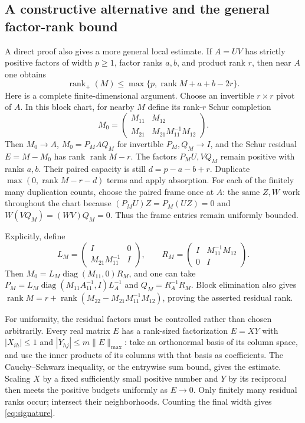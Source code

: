 \documentclass[11pt]{article}
\theoremstyle{definition}\newtheorem{definition}[theorem]{Definition}
\theoremstyle{remark}\newtheorem{remark}[theorem]{Remark}
\newcommand{\rk}{\operatorname{rank}}
\newcommand{\rp}{\operatorname{rank}_{+}}
\begin{document}
\subsection{A constructive alternative and the general factor-rank bound}
A direct proof also gives a more general local estimate. If $A=UV$ has strictly positive factors of width $p\ge1$, factor ranks $a,b$, and product rank $r$, then near $A$ one obtains
\begin{equation}\label{eq:signature}
\rp(M)\le\max\{p,\rk M+a+b-2r\}.
\end{equation}
Here is a complete finite-dimensional argument. Choose an invertible $r\times r$ pivot of $A$. In this block chart, for nearby $M$ define its rank-$r$ Schur completion
\[
M_0=\begin{pmatrix}M_{11}&M_{12}\\M_{21}&M_{21}M_{11}^{-1}M_{12}\end{pmatrix}.
\]
Then $M_0\to A$, $M_0=P_M A Q_M$ for invertible $P_M,Q_M\to I$, and the Schur residual $E=M-M_0$ has rank $\rk M-r$. The factors $P_MU,VQ_M$ remain positive with ranks $a,b$. Their paired capacity is still $d=p-a-b+r$. Duplicate $\max(0,\rk M-r-d)$ terms and apply absorption. For each of the finitely many duplication counts, choose the paired frame once at $A$: the same $Z,W$ work throughout the chart because $(P_MU)Z=P_M(UZ)=0$ and $W(VQ_M)=(WV)Q_M=0$. Thus the frame entries remain uniformly bounded.

Explicitly, define
\[
L_M=\begin{pmatrix}I&0\\M_{21}M_{11}^{-1}&I\end{pmatrix},\qquad
R_M=\begin{pmatrix}I&M_{11}^{-1}M_{12}\\0&I\end{pmatrix}.
\]
Then $M_0=L_M\operatorname{diag}(M_{11},0)R_M$, and one can take
$P_M=L_M\operatorname{diag}(M_{11}A_{11}^{-1},I)L_A^{-1}$ and
$Q_M=R_A^{-1}R_M$. Block elimination also gives
$\rk M=r+\rk(M_{22}-M_{21}M_{11}^{-1}M_{12})$, proving the asserted residual rank.

For uniformity, the residual factors must be controlled rather than chosen arbitrarily. Every real matrix $E$ has a rank-sized factorization $E=XY$ with $|X_{ih}|\le1$ and $|Y_{hj}|\le m\|E\|_{\max}$: take an orthonormal basis of its column space, and use the inner products of its columns with that basis as coefficients. The Cauchy--Schwarz inequality, or the entrywise sum bound, gives the estimate. Scaling $X$ by a fixed sufficiently small positive number and $Y$ by its reciprocal then meets the positive budgets uniformly as $E\to0$. Only finitely many residual ranks occur; intersect their neighborhoods. Counting the final width gives \eqref{eq:signature}.
\end{document}
